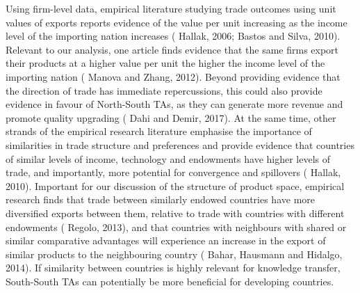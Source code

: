 Using firm-level data, empirical literature studying
trade outcomes using unit values of exports reports evidence of the
value per unit increasing as the income level of the importing nation
increases (\cite{hallak_product_2006} Hallak, 2006; \cite{bastos_quality_2010} Bastos and Silva, 2010). Relevant to our
analysis, one article finds evidence that the same firms export their
products at a higher value per unit the higher the income level of the
importing nation (\cite{manova_export_2012} Manova and Zhang, 2012). Beyond providing evidence
that the direction of trade has immediate repercussions, this could also
provide evidence in favour of North-South TAs, as they can generate more
revenue and promote quality upgrading (\cite{dahi_south-south_2017} Dahi and Demir, 2017). At the
same time, other strands of the empirical research literature emphasise
the importance of similarities in trade structure and preferences and
provide evidence that countries of similar levels of income, technology
and endowments have higher levels of trade, and importantly, more
potential for convergence and spillovers (\cite{hallak_product-quality_2010} Hallak, 2010). Important for
our discussion of the structure of product space, empirical research
finds that trade between similarly endowed countries have more
diversified exports between them, relative to trade with countries with
different endowments (\cite{regolo_export_2013} Regolo, 2013), and that countries with neighbours
with shared or similar comparative advantages will experience an
increase in the export of similar products to the neighbouring country
(\cite{bahar_neighbors_2014} Bahar, Hausmann and Hidalgo, 2014). If similarity between countries is
highly relevant for knowledge transfer, South-South TAs can potentially
be more beneficial for developing countries.